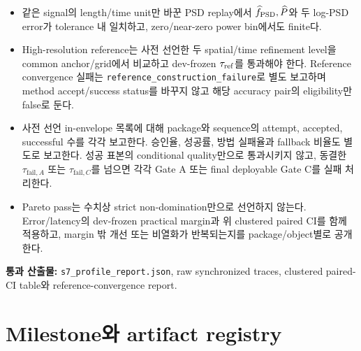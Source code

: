 \documentclass[10pt]{article}
\newcommand{\code}[1]{{\small\nolinkurl{#1}}}
\newcommand{\pass}[1]{\textcolor{GateGreen}{\textbf{#1}}}
\begin{document}
\begin{itemize}
  유지하며 run 뒤 역할을 바꾸지 않는다.
  \item [\(\square\)] 같은 signal의 length/time unit만 바꾼 PSD replay에서
  \(\widehat f_{\rm PSD},\widehat P\)와 두 log-PSD error가 tolerance 내 일치하고,
  zero/near-zero power bin에서도 finite다.
  \item [\(\square\)] High-resolution reference는 사전 선언한 두 spatial/time refinement level을
  common anchor/grid에서 비교하고 dev-frozen \(\tau_{\rm ref}\)를 통과해야 한다.
  Reference convergence 실패는 \code{reference\_construction\_failure}로 별도 보고하며
  method accept/success status를 바꾸지 않고 해당 accuracy pair의 eligibility만 false로 둔다.
  \item [\(\square\)] 사전 선언 in-envelope 목록에 대해 package와 sequence의
  attempt, accepted, successful 수를 각각 보고한다.
  승인율, 성공률, 방법 실패율과 fallback 비율도 별도로 보고한다.
  성공 표본의 conditional quality만으로
  통과시키지 않고, 동결한 \(\tau_{\mathrm{fail},A}\) 또는 \(\tau_{\mathrm{fail},C}\)를 넘으면
  각각 Gate A 또는 final deployable Gate C를 실패 처리한다.
  \item [\(\square\)] Pareto pass는 수치상 strict non-domination만으로 선언하지 않는다.
  Error/latency의 dev-frozen practical margin과 위 clustered paired CI를 함께 적용하고,
  margin 밖 개선 또는 비열화가 반복되는지를 package/object별로 공개한다.
\end{itemize}

\pass{통과 산출물:} \code{s7\_profile\_report.json}, raw synchronized traces,\newline
clustered paired-CI table와 reference-convergence report.

\section{Milestone와 artifact registry}
\end{document}
